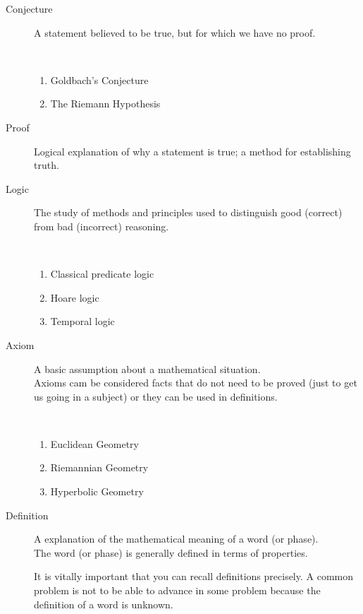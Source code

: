 \documentclass[a4paper]{article}
\begin{document}
\begin{description}
\item[Conjecture] A statement believed to be true, but for which we have no proof.

\begin{eg}[4]\ 
\begin{enumerate}
\item Goldbach's Conjecture
\item The Riemann Hypothesis
\end{enumerate}
\end{eg}

\item[Proof] Logical explanation of why a statement is true; a method for establishing truth.
\item[Logic] The study of methods and principles used to distinguish good (correct) from bad (incorrect) reasoning.

\begin{eg}[5]\ 
\begin{enumerate}
\item Classical predicate logic
\item Hoare logic
\item Temporal logic
\end{enumerate}
\end{eg}

\item[Axiom] A basic assumption about a mathematical situation.\\
Axioms cam be considered facts that do not need to be proved (just to get us going in a subject) or they can be used in definitions.
\begin{eg}[6] \ 
\begin{enumerate}
\item Euclidean Geometry
\item Riemannian Geometry
\item Hyperbolic Geometry
\end{enumerate}
\end{eg}

\item[Definition] A explanation of the mathematical meaning of a word (or phase).\\
The word (or phase) is generally defined in terms of properties.

\begin{wn}
It is vitally important that you can recall definitions precisely. A common problem is not to be able to advance in some problem because the definition of a word is unknown.
\end{wn}


\end{description}
\end{document}
